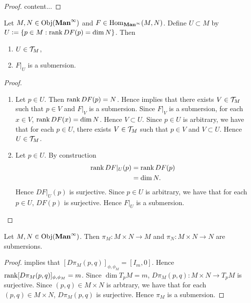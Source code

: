 \documentclass{book}
\begin{document}
	\begin{proof}
		content...
	\end{proof}
	
	\begin{ex} 
		Let $M, N \in \operatorname{Obj}(\operatorname*{\text{\textbf{Man}}^{\infty}})$ and $F \in \operatorname{Hom}_{\operatorname*{\text{\textbf{Man}}^{\infty}}}(M,N)$. Define $U \subset M$ by $U \vcentcolon= \{p \in M: \operatorname{\text{rank}} DF(p) = \dim N\}$. Then 
		\begin{enumerate}
			\item $U \in \mathcal{T}_M$,
			\item $F|_U$ is a submersion.
		\end{enumerate}
	\end{ex}
	
	\begin{proof}\
		\begin{enumerate}
			\item Let $p \in U$. Then $\operatorname{\text{rank}} DF(p) = N$. Hence  implies that there exists $V \in \mathcal{T}_M$ such that $p \in V$ and $F|_V$ is a submersion. Since $F|_V$ is a submersion, for each $x \in V$, $\operatorname{\text{rank}} DF(x) = \dim N$. Hence $V \subset U$. Since $p \in U$ is arbitrary, we have that for each $p \in U$, there exists $V \in \mathcal{T}_M$ such that $p \in V$ and $V \subset U$. Hence $U \in \mathcal{T}_M$.
			\item Let $p \in U$. By construction  
			\begin{align*}
				\operatorname{\text{rank}} DF|_U(p)
				& = \operatorname{\text{rank}} DF(p) \\ 
				& = \dim N.
			\end{align*}
			Hence $DF|_U(p)$ is surjective. Since $p \in U$ is arbitrary, we have that for each $p \in U$, $DF(p)$ is surjective. Hence $F|_U$ is a submersion.
		\end{enumerate}
	\end{proof}

	\begin{ex} 
		Let $M,N \in \operatorname{Obj}(\operatorname*{\text{\textbf{Man}}^{\infty}})$. Then $\pi_M: M \times N \rightarrow M$ and $\pi_N: M \times N \rightarrow N$ are submersions.
	\end{ex}

	\begin{proof}
		 implies that $[D \pi_M(p,q)]_{\phi, \phi_M} = [I_m, 0]$. Hence $\operatorname{\text{rank}} [D \pi_M(p,q)]_{\phi, \phi_M} = m$. Since $\dim T_p M = m$, $D \pi_M(p,q): M \times N \rightarrow T_p M$ is surjective. Since $(p,q) \in M \times N$ is arbtrary, we have that for each $(p,q) \in M \times N$, $D\pi_M(p,q)$ is surjective. Hence $\pi_M$ is a submersion. 
	\end{proof}
	
\end{document}
